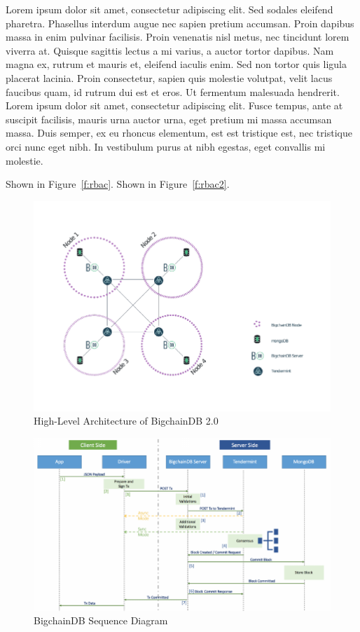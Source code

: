 Lorem ipsum dolor sit amet, consectetur adipiscing elit. Sed sodales
eleifend pharetra. Phasellus interdum augue nec sapien pretium accumsan.
Proin dapibus massa in enim pulvinar facilisis. Proin venenatis nisl metus,
nec tincidunt lorem viverra at. Quisque sagittis lectus a mi varius, a
auctor tortor dapibus. Nam magna ex, rutrum et mauris et, eleifend iaculis
enim. Sed non tortor quis ligula placerat lacinia. Proin consectetur, sapien
quis molestie volutpat, velit lacus faucibus quam, id rutrum dui est et
eros. Ut fermentum malesuada hendrerit. Lorem ipsum dolor sit amet,
consectetur adipiscing elit. Fusce tempus, ante at suscipit facilisis,
mauris urna auctor urna, eget pretium mi massa accumsan massa. Duis semper,
ex eu rhoncus elementum, est est tristique est, nec tristique orci nunc eget
nibh. In vestibulum purus at nibh egestas, eget convallis mi molestie.







Shown in Figure~\ref{f:rbac}.
Shown in Figure~\ref{f:rbac2}.

\begin{figure}[!htb]
	\centering\includegraphics[width=\columnwidth]{images/bdb-arch.pdf}  
	\caption{High-Level Architecture of BigchainDB 
		2.0~\cite{bdb18d}}\label{f:bdb}
\end{figure}

\begin{figure}[!htb]
	\centering\includegraphics[width=\columnwidth]{images/bdb-seq.pdf}  
	\caption{BigchainDB Sequence Diagram~\cite{gautam18}}\label{f:bdb2}
\end{figure}

